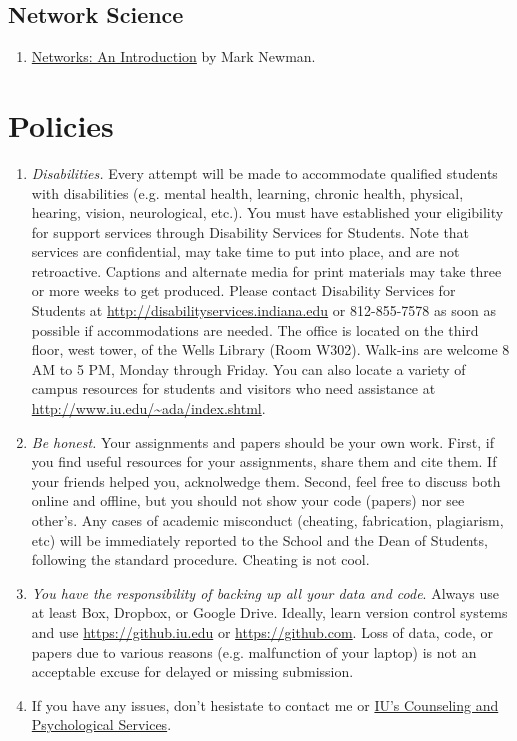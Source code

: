 \documentclass[11pt,article,oneside]{memoir}
\begin{document}
\subsection{Network Science}

\begin{enumerate}

\item \href{https://www.amazon.com/Networks-Introduction-Mark-Newman/dp/0199206651}{Networks: An Introduction} by Mark Newman. 

\end{enumerate}

\section{Policies}

\begin{enumerate}

\item \emph{Disabilities.} Every attempt will be made to accommodate qualified
students with disabilities (e.g. mental health, learning, chronic health,
physical, hearing, vision, neurological, etc.). You must have established your
eligibility for support services through Disability Services for Students. Note
that services are confidential, may take time to put into place, and are not
retroactive.  Captions and alternate media for print materials may take three
or more weeks to get produced. Please contact Disability Services for Students
at \url{http://disabilityservices.indiana.edu} or 812-855-7578 as soon as
possible if accommodations are needed. The office is located on the third
floor, west tower, of the Wells Library (Room W302). Walk-ins are welcome 8 AM
to 5 PM, Monday through Friday. You can also locate a variety of campus
resources for students and visitors who need assistance at
\url{http://www.iu.edu/~ada/index.shtml}. 

\item \emph{Be honest.} Your assignments and papers should be your own work.
First, if you find useful resources for your assignments, share them and cite
them. If your friends helped you, acknolwedge them. Second, feel free to
discuss both online and offline, but you should not show your code (papers) nor
see other's. Any cases of academic misconduct (cheating, fabrication,
plagiarism, etc) will be immediately reported to the School and the Dean of
Students, following the standard procedure. Cheating is not cool. 

\item \emph{You have the responsibility of backing up all your data and code}.
Always use at least Box, Dropbox, or Google Drive. Ideally, learn version
control systems and use \url{https://github.iu.edu} or
\url{https://github.com}. Loss of data, code, or papers due to various reasons
(e.g. malfunction of your laptop) is not an acceptable excuse for delayed or
missing submission. 

\item If you have any issues, don't hesistate to contact me or
\href{http://healthcenter.indiana.edu/counseling/index.shtml}{IU's Counseling
and Psychological Services}. 


\end{enumerate}
\end{document}
